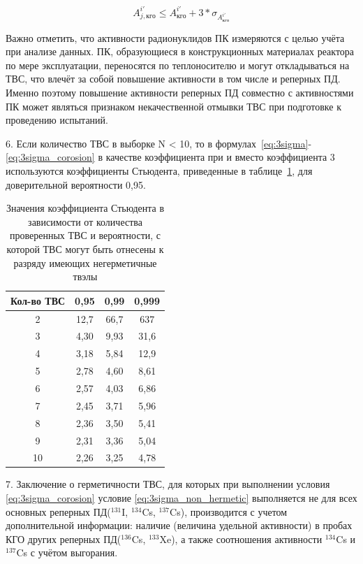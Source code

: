 \begin{equation} \label{eq:3sigma_corosion}
	A_{j,кго}^{i'} \leq {A}_{кго}^{i'} + 3*\sigma_{{A}_{кго}^{i'}}
\end{equation}

Важно отметить, что активности радионуклидов ПК измеряются с целью учёта при анализе данных. ПК, образующиеся в конструкционных материалах реактора по мере эксплуатации, переносятся по теплоносителю и могут откладываться на ТВС, что влечёт за собой повышение активности в том числе и реперных ПД\cite{corosion}. Именно поэтому повышение активности реперных ПД совместно с активностями ПК может являться признаком некачественной отмывки ТВС при подготовке к проведению испытаний.

6. Если количество ТВС в выборке N < 10, то в формулах~\ref{eq:3sigma}-\ref{eq:3sigma_corosion}  в качестве коэффициента при  и  вместо коэффициента 3 используются коэффициенты Стьюдента, приведенные в таблице~\ref{tab:Student}, для доверительной вероятности 0,95.
\begin{table}[H]
	\caption{Значения коэффициента Стьюдента в зависимости от количества проверенных ТВС и вероятности, с которой ТВС могут быть отнесены к разряду имеющих негерметичные твэлы} \label{tab:Student}
	\centering
	\begin{tabular}{|c|c|c|c|}
		\hline Кол-во ТВС & 0,95 & 0,99 & 0,999 \\ 
		\hline  2 & 12,7 & 66,7  & 637 \\ 
		\hline 3 &  4,30 &  9,93 & 31,6 \\ 
		\hline 4 &  3,18 &  5,84 & 12,9 \\ 
		\hline 5 &  2,78 &  4,60 & 8,61 \\ 
		\hline 6 &  2,57 &  4,03 & 6,86 \\ 
		\hline 7 &  2,45 &  3,71 & 5,96 \\ 
		\hline 8 &  2,36 &  3,50 & 5,41 \\ 
		\hline 9 &  2,31 &  3,36 & 5,04 \\ 
		\hline 10 & 2,26 &  3,25 & 4,78 \\ 
		\hline 
	\end{tabular} 
\end{table} 

7. Заключение о герметичности ТВС, для которых при выполнении
условия \ref{eq:3sigma_corosion} условие \ref{eq:3sigma_non_hermetic} выполняется не для всех основных реперных ПД($^{131}$I, $^{134}$Cs, $^{137}$Cs), производится с учетом дополнительной информации: наличие
(величина удельной активности) в пробах КГО других реперных ПД($^{136}$Cs, $^{133}$Xe), а также соотношения активности $^{134}$Cs и $^{137}$Cs с учётом выгорания.

